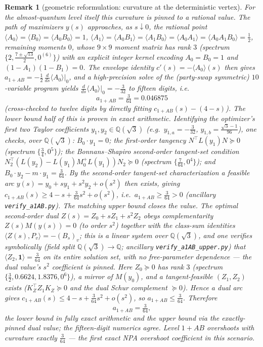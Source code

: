 \documentclass[11pt]{article}
\newtheorem{remark}[theorem]{Remark}
\begin{document}
\begin{remark}[geometric reformulation: curvature at the deterministic vertex]
For the almost-quantum level itself this curvature is pinned to a rational value.
The path of maximizers $y(s)$ approaches, as $s\downarrow0$, the rational point
$\langle A_0\rangle=\langle B_0\rangle=\langle A_0B_0\rangle=1$,
$\langle A_1\rangle=\langle A_0B_1\rangle=\langle A_1B_0\rangle=\langle A_0A_1\rangle
=\langle A_0A_1B_0\rangle=\tfrac12$, remaining moments $0$, whose $9\times9$ moment
matrix has rank $3$ (spectrum $\{2,\tfrac{7\pm\sqrt{13}}2,0^{(6)}\}$) with an
explicit integer kernel encoding $A_0=B_0=1$ and $(1-A_1)(1-B_1)=0$. The envelope
identity $c'(s)=-\langle A_0\rangle(s)$ then gives
$a_{1+AB}=-\tfrac12\,\tfrac{d}{ds}\langle A_0\rangle\big|_{0}$, and a
high-precision solve of the (party-swap symmetric) $10$-variable program yields
$\tfrac{d}{ds}\langle A_0\rangle|_0=-\tfrac{3}{32}$ to fifteen digits, i.e.
\[
  \boxed{\,a_{1+AB}=\tfrac{3}{64}=0.046875\,}
\]
(cross-checked to twelve digits by directly fitting $c_{1+AB}(s)-(4-s)$). The lower
bound half of this is \emph{proven in exact arithmetic}. Identifying the optimizer's
first two Taylor coefficients $y_1,y_2\in\mathbb Q(\sqrt3)$ (e.g.\ $y_{1,a}=-\tfrac3{32}$,
$y_{1,b}=\tfrac{\sqrt3-1}{96}$), one checks, over $\mathbb Q(\sqrt3)$: $B_0\!\cdot\!y_1=0$;
the first-order tangency $N^\top L(y_1)N\succeq0$ (spectrum $\{\tfrac34,0^{5}\}$); the
Bonnans--Shapiro second-order tangent-set condition
$N_2^\top(L(y_2)-L(y_1)M_0^{+}L(y_1))N_2\succeq0$ (spectrum $\{\tfrac7{64},0^{4}\}$);
and $B_0\!\cdot\!y_2-m\!\cdot\!y_1=\tfrac3{64}$. By the second-order tangent-set
characterization a feasible arc $y(s)=y_0+sy_1+s^2y_2+o(s^2)$ then exists, giving
$c_{1+AB}(s)\ge4-s+\tfrac3{64}s^2+o(s^2)$, i.e.\ $a_{1+AB}\ge\tfrac3{64}>0$ (ancillary
\texttt{verify\_a1AB.py}). The matching upper bound closes the value. The optimal
second-order dual $Z(s)=Z_0+sZ_1+s^2Z_2$ obeys complementarity $Z(s)M(y(s))=0$ (to
order $s^2$) together with the class-sum identities $\langle Z(s),P_v\rangle=-(B_s)_v$;
this is a linear system over $\mathbb Q(\sqrt3)$, and one verifies \emph{symbolically}
(field split $\mathbb Q(\sqrt3)\to\mathbb Q$; ancillary \texttt{verify\_a1AB\_upper.py})
that $\langle Z_2,\mathbf 1\rangle=\tfrac3{64}$
on its \emph{entire} solution set, with no free-parameter dependence --- the dual
value's $s^2$ coefficient is pinned. Here $Z_0\succeq0$ has rank $3$ (spectrum
$\{\tfrac32,0.6624,1.8376,0^{6}\}$), a mirror of $M(y_0)$, and a tangent-feasible
$(Z_1,Z_2)$ exists ($K_Z^\top Z_1K_Z\succeq0$ and the dual Schur complement
$\succeq0$). Hence a dual arc gives $c_{1+AB}(s)\le4-s+\tfrac3{64}s^2+o(s^2)$, so
$a_{1+AB}\le\tfrac3{64}$. Therefore
\[
  a_{1+AB}=\tfrac3{64},
\]
the lower bound in fully exact arithmetic and the upper bound via the exactly-pinned
dual value; the fifteen-digit numerics agree. Level $1{+}AB$ overshoots with curvature
exactly $\tfrac3{64}$ --- the first exact NPA overshoot coefficient in this scenario.


\end{remark}
\end{document}
